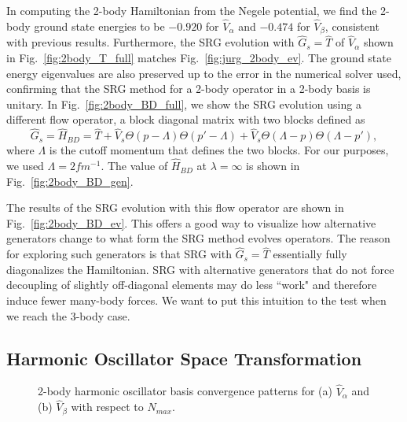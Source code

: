 In computing the 2-body Hamiltonian from the Negele potential, we find the 2-body ground state energies to be $-0.920$ for $\hat{V}_\alpha$ and $-0.474$ for $\hat{V}_\beta$, consistent with previous results. Furthermore, the SRG evolution with $\hat{G}_s=\hat{T}$ of $\hat{V}_\alpha$ shown in Fig.~\ref{fig:2body_T_full} matches Fig.~\ref{fig:jurg_2body_ev}. The ground state energy eigenvalues are also preserved up to the error in the numerical solver used, confirming that the SRG method for a 2-body operator in a 2-body basis is unitary. In Fig.~\ref{fig:2body_BD_full}, we show the SRG evolution using a different flow operator, a block diagonal matrix with two blocks defined as
\begin{equation}\label{eq:H_bd_p}
\hat{G}_s = \hat{H}_{BD} = \hat{T} + \hat{V}_s \Theta(p - \Lambda) \Theta(p' - \Lambda) + \hat{V}_s \Theta(\Lambda - p) \Theta(\Lambda - p'),
\end{equation}
where $\Lambda$ is the cutoff momentum that defines the two blocks. For our purposes, we used $\Lambda=2 fm^{-1}$. The value of $\hat{H}_{BD}$ at $\lambda=\infty$ is shown in Fig.~\ref{fig:2body_BD_gen}.

The results of the SRG evolution with this flow operator are shown in Fig.~\ref{fig:2body_BD_ev}. This offers a good way to visualize how alternative generators change to what form the SRG method evolves operators. The reason for exploring such generators is that SRG with $\hat{G}_s=\hat{T}$ essentially fully diagonalizes the Hamiltonian. SRG with alternative generators that do not force decoupling of slightly off-diagonal elements may do less ``work" and therefore induce fewer many-body forces. We want to put this intuition to the test when we reach the 3-body case.

\subsection{Harmonic Oscillator Space Transformation}
\begin{figure}[t]
\begin{center}
\end{center}
\caption{2-body harmonic oscillator basis convergence patterns for (a) $\hat{V}_\alpha$ and (b) $\hat{V}_\beta$ with respect to $N_{max}$.}
\label{fig:2body_nmax}
\end{figure}

